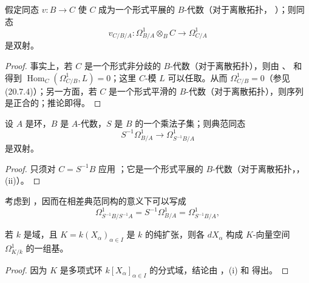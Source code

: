 \begin{corollary}[20.5.8]
\label{0.20.5.8-fr}
假定同态 $v:B\to C$ 使 $C$ 成为一个形式平展的 $B$-代数（对于离散拓扑，
）；则同态 
\[
  v_{C/B/A}:\Omega^1_{B/A}\otimes_B C\to\Omega^1_{C/A}
\]
是双射。
\end{corollary}

\begin{proof}
事实上，若 $C$ 是一个形式非分歧的 $B$-代数（对于离散拓扑），则由
、 和  得到
$\operatorname{Hom}_C(\Omega^1_{C/B},L)=0$；这里 $C$-模 $L$ 可以任取。从而
$\Omega^1_{C/B}=0$（参见 (20.7.4)）；另一方面，若 $C$ 是一个形式平滑的
$B$-代数（对于离散拓扑），则序列  是正合的；推论即得。
\end{proof}

\begin{corollary}[20.5.9]
\label{0.20.5.9-fr}
设 $A$ 是环，$B$ 是 $A$-代数，$S$ 是 $B$ 的一个乘法子集；则典范同态
\begin{equation}
\tag{20.5.9.1}
\label{0.20.5.9.1-fr}
  S^{-1}\Omega^1_{B/A}\to\Omega^1_{S^{-1}B/A}
\end{equation}
是双射。
\end{corollary}

\begin{proof}
只须对 $C=S^{-1}B$ 应用 ；它是一个形式平展的
$B$-代数（对于离散拓扑，，(ii)）。
\end{proof}

考虑到 ，因而在相差典范同构的意义下可以写成
\begin{equation}
\tag{20.5.9.2}
\label{0.20.5.9.2-fr}
  \Omega^1_{S^{-1}B/S^{-1}A}
  =S^{-1}\Omega^1_{B/A}
  =\Omega^1_{S^{-1}B/A},
\end{equation}

\begin{corollary}[20.5.10]
\label{0.20.5.10-fr}
若 $k$ 是域，且 $K=k(X_\alpha)_{\alpha\in I}$ 是 $k$ 的纯扩张，则各
$dX_\alpha$ 构成 $K$-向量空间 $\Omega^1_{K/k}$ 的一组基。
\end{corollary}

\begin{proof}
因为 $K$ 是多项式环 $k[X_\alpha]_{\alpha\in I}$ 的分式域，结论由
，(i) 和  得出。
\end{proof}

